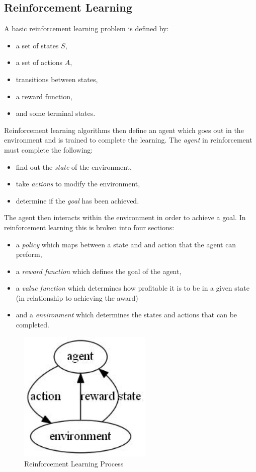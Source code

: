 \documentclass[conference]{IEEEtran}
\begin{document}
\subsection{Reinforcement Learning}
A basic reinforcement learning problem is defined by:
\begin{itemize}
    \item a set of states $S$,
    \item a set of actions $A$,
    \item transitions between states,
    \item a reward function,
    \item and some terminal states.
\end{itemize}
Reinforcement learning algorithms then define an agent which goes out in the environment and is trained to complete the learning. 
The \emph{agent} in reinforcement must complete the following:
\begin{itemize}
	\item find out the \emph{state} of the environment,
	\item take \emph{actions} to modify the environment,
	\item determine if the \emph{goal} has been achieved.
\end{itemize}
The agent then interacts within the environment in order to achieve a goal.  In reinforcement learning this is broken into four sections:
\begin{itemize}
	\item a \emph{policy} which maps between a state and and action that the agent can preform,
	\item a \emph{reward function} which defines the goal of the agent,
	\item a \emph{value function} which determines how profitable it is to be in a given state (in relationship to achieving the award)
	\item and a \emph{environment} which determines the states and actions that can be completed.
\end{itemize}

\begin{figure}
\centering
\includegraphics[width=2.5in]{RLDiagram}
\caption{Reinforcement Learning Process}
\label{RLDiagram}
\end{figure}
\end{document}
